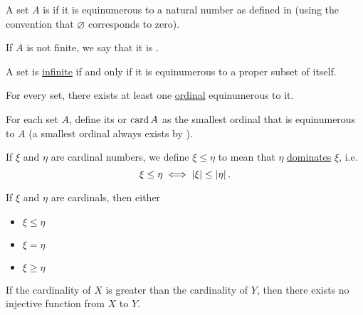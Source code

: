 \begin{Definition}\label{def:finite_set}\cite[133]{Enderton1977}
  A set \( A \) is  if it is equinumerous to a natural number as defined in  (using the convention that \( \varnothing \) corresponds to zero).

  If \( A \) is not finite, we say that it is .
\end{Definition}

\begin{Proposition}\label{thm:infinite_set_iff_equinumerous_to_proper_subset}\cite[Corollary 6D]{Enderton1977}
  A set is \hyperref[def:finite_set]{infinite} if and only if it is equinumerous to a proper subset of itself.
\end{Proposition}

\begin{Theorem}\label{thm:equinumerous_ordinal_existence}\cite[197]{Enderton1977}
  For every set, there exists at least one \hyperref[def:ordinal]{ordinal} equinumerous to it.
\end{Theorem}

\begin{Definition}\label{def:cardinal}\cite[197]{Enderton1977}
  For each set \( A \), define its  or  \( \operatorname{card} A \) as the smallest ordinal that is equinumerous to \( A \) (a smallest ordinal always exists by ).

  If \( \xi \) and \( \eta \) are cardinal numbers, we define \( \xi \leq \eta \) to mean that \( \eta \) \hyperref[def:set_domination]{dominates} \( \xi \), i.e.
  \begin{equation*}
    \xi \leq \eta \iff \left\vert \xi \right\vert \leq \left\vert \eta \right\vert.
  \end{equation*}
\end{Definition}

\begin{Theorem}\label{thm:cardinal_trichotomy}\cite[theorem 6M(5)]{Enderton1977}
  If \( \xi \) and \( \eta \) are cardinals, then either
  \begin{itemize}
    \item \( \xi \leq \eta \)
    \item \( \xi = \eta \)
    \item \( \xi \geq \eta \)
  \end{itemize}
\end{Theorem}

\begin{Corollary}\label{def:pigeonhole_principle}
  If the cardinality of \( X \) is greater than the cardinality of \( Y \), then there exists no injective function from \( X \) to \( Y \).
\end{Corollary}

